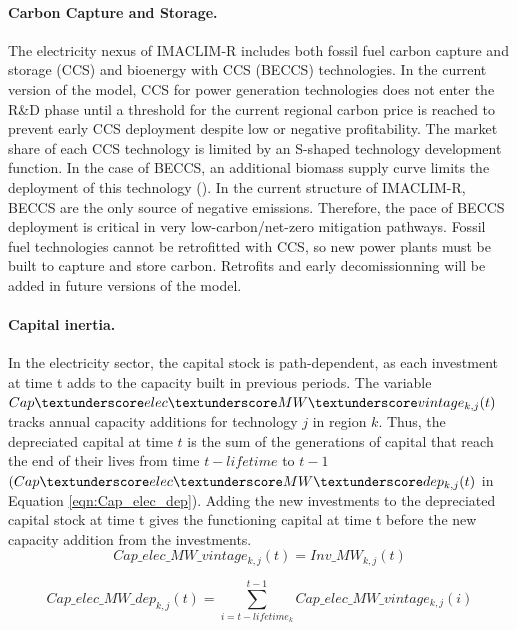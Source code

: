 \paragraph{Carbon Capture and Storage.}
The electricity nexus of IMACLIM-R includes both fossil fuel carbon capture and storage (CCS) and bioenergy with CCS (BECCS) technologies. In the current version of the model, CCS for power generation technologies does not enter the R\&D phase until a threshold for the current regional carbon price is reached to prevent early CCS deployment despite low or negative profitability. The market share of each CCS technology is limited by an S-shaped technology development function. In the case of BECCS, an additional biomass supply curve limits the deployment of this technology (\cite{Hoogwijk2009}). In the current structure of IMACLIM-R, BECCS are the only source of negative emissions. Therefore, the pace of BECCS deployment is critical in very low-carbon/net-zero mitigation pathways. Fossil fuel technologies cannot be retrofitted with CCS, so new power plants must be built to capture and store carbon. Retrofits and early decomissionning will be added in future versions of the model.


\paragraph{Capital inertia.}
In the electricity sector, the capital stock is path-dependent, as each investment at time t adds to the capacity built in previous periods. The variable $Cap\textunderscore elec\textunderscore MW \textunderscore vintage_{k,j}(t)$ tracks annual capacity additions for technology $j$ in region $k$. Thus, the depreciated capital at time $t$ is the sum of the generations of capital that reach the end of their lives from time $t - lifetime$ to $t - 1$ $(Cap\textunderscore elec\textunderscore MW\textunderscore dep_{k,j}(t)$ in Equation \ref{eqn:Cap_elec_dep}). Adding the new investments to the depreciated capital stock at time t gives the functioning capital at time t before the new capacity addition from the investments.
\begin{dmath}
    Cap\_elec\_ MW\_vintage_{k,j}(t) = Inv\_MW_{k,j}(t)
    \label{eqn:Cap_elec_vintage}
\end{dmath}

\begin{dmath}
    Cap\_elec\_MW\_dep_{k,j}(t) = \sum_{i = t - lifetime_{k}}^{t-1}Cap\_elec\_MW\_vintage_{k,j}(i)
    \label{eqn:Cap_elec_dep}
\end{dmath}

